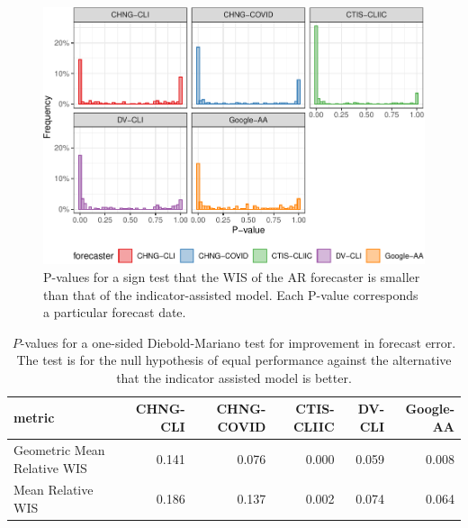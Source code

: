\documentclass[9pt,twoside,lineno]{pnas-new}
\begin{document}
\clearpage

\begin{figure}

{\centering \includegraphics[width=\textwidth]{fig/sign-test-1} 

}

\caption{P-values for a sign test that the WIS of the AR forecaster is smaller than that of the indicator-assisted model. Each P-value corresponds a particular forecast date.}\label{fig:sign-test}
\end{figure}

\begin{table}

\caption{\label{tab:dm-test}$P$-values for a one-sided Diebold-Mariano test for improvement in forecast error. The test is for the null hypothesis of equal performance against the alternative that the indicator assisted model is better.}
\centering
\begin{tabular}[t]{lrrrrr}
\toprule
metric & CHNG-CLI & CHNG-COVID & CTIS-CLIIC & DV-CLI & Google-AA\\
\midrule
Geometric Mean Relative WIS & 0.141 & 0.076 & 0.000 & 0.059 & 0.008\\
Mean Relative WIS & 0.186 & 0.137 & 0.002 & 0.074 & 0.064\\
\bottomrule
\end{tabular}
\end{table}
\end{document}
